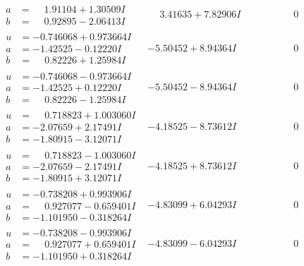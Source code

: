 \documentclass[1p]{elsarticle_modified}
\theoremstyle{definition}
\begin{document}
$$\begin{array}{c|c|c}
\begin{aligned}
a &= \phantom{-}1.91104 + 1.30509 I \\
b &= \phantom{-}0.92895 - 2.06413 I\end{aligned}
 & \phantom{-}3.41635 + 7.82906 I & \phantom{-0.000000 } 0 \\ \hline\begin{aligned}
u &= -0.746068 + 0.973664 I \\
a &= -1.42525 - 0.12220 I \\
b &= \phantom{-}0.82226 + 1.25984 I\end{aligned}
 & -5.50452 + 8.94364 I & \phantom{-0.000000 } 0 \\ \hline\begin{aligned}
u &= -0.746068 - 0.973664 I \\
a &= -1.42525 + 0.12220 I \\
b &= \phantom{-}0.82226 - 1.25984 I\end{aligned}
 & -5.50452 - 8.94364 I & \phantom{-0.000000 } 0 \\ \hline\begin{aligned}
u &= \phantom{-}0.718823 + 1.003060 I \\
a &= -2.07659 + 2.17491 I \\
b &= -1.80915 - 3.12071 I\end{aligned}
 & -4.18525 - 8.73612 I & \phantom{-0.000000 } 0 \\ \hline\begin{aligned}
u &= \phantom{-}0.718823 - 1.003060 I \\
a &= -2.07659 - 2.17491 I \\
b &= -1.80915 + 3.12071 I\end{aligned}
 & -4.18525 + 8.73612 I & \phantom{-0.000000 } 0 \\ \hline\begin{aligned}
u &= -0.738208 + 0.993906 I \\
a &= \phantom{-}0.927077 - 0.659401 I \\
b &= -1.101950 - 0.318264 I\end{aligned}
 & -4.83099 + 6.04293 I & \phantom{-0.000000 } 0 \\ \hline\begin{aligned}
u &= -0.738208 - 0.993906 I \\
a &= \phantom{-}0.927077 + 0.659401 I \\
b &= -1.101950 + 0.318264 I\end{aligned}
 & -4.83099 - 6.04293 I & \phantom{-0.000000 } 0 \\ \hline\begin{aligned}

\end{aligned}
\end{array}$$
\end{document}
